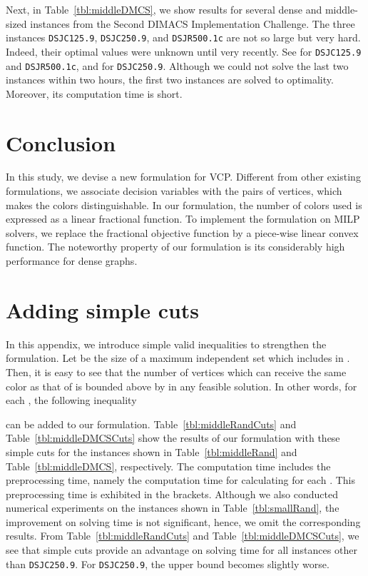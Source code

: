 \documentclass[11pt,a4paper]{article}
\begin{document}
\par 

Next, in Table~\ref{tbl:middleDMCS}, 
we show results for several dense and middle-sized instances from the Second DIMACS Implementation Challenge. 
The three instances \texttt{DSJC125.9}, \texttt{DSJC250.9},	and \texttt{DSJR500.1c} are not so large but very hard. 
Indeed, their optimal values were unknown until very recently. See \cite{GuMa} for \texttt{DSJC125.9} and \texttt{DSJR500.1c}, 
and \cite{HeCoSe} for \texttt{DSJC250.9}. 
Although we could not solve the last two instances within two hours, 
the first two instances are solved to optimality. 
Moreover, its computation time is short. 


\section{Conclusion}

In this study, we devise a new formulation for VCP. 
Different from other existing formulations, 
we associate decision variables with the pairs of vertices, 
which makes the colors distinguishable. 
In our formulation, 
the number of colors used is expressed as a linear fractional function. 
To implement the formulation on MILP solvers, 
we replace the fractional objective function by a piece-wise linear convex function. 
The noteworthy property of our formulation is 
its considerably high performance for dense graphs. 





\section*{Adding simple cuts}

In this appendix, we introduce simple valid inequalities to strengthen the formulation. 
Let  be the size of a maximum independent set  which includes  in . 
Then, it is easy to see that the number of vertices which can receive the same color as that of  is 
bounded above by  in any feasible solution. In other words, for each , 
the following inequality 

can be added to our formulation. 
Table~\ref{tbl:middleRandCuts} and Table~\ref{tbl:middleDMCSCuts} show 
the results of our formulation with these simple cuts for the instances shown in 
Table~\ref{tbl:middleRand} and Table~\ref{tbl:middleDMCS}, respectively. 
The computation time includes the preprocessing time, 
namely the computation time for calculating  for each . 
This preprocessing time is exhibited in the brackets. 
Although we also conducted numerical experiments on the instances shown in Table~\ref{tbl:smallRand}, 
the improvement on solving time is not significant, hence, we omit the corresponding results. 
From Table~\ref{tbl:middleRandCuts} and Table~\ref{tbl:middleDMCSCuts}, 
we see that simple cuts provide an advantage on solving time for all instances other than \texttt{DSJC250.9}.  
For \texttt{DSJC250.9}, the upper bound becomes slightly worse. 
\end{document}
